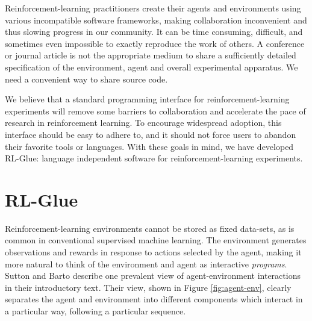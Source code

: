\documentclass[twoside,11pt]{article}
\begin{document}
Reinforcement-learning practitioners create their agents and environments using various incompatible software frameworks, making collaboration inconvenient and thus slowing progress in our community.  It can be time consuming, difficult, and sometimes even impossible to exactly reproduce the work of others.  A conference or journal article is not the appropriate medium to share a sufficiently detailed specification of the environment, agent and overall experimental apparatus.  We need a convenient way to share source code.

%
%
We believe that a standard programming interface for reinforcement-learning experiments will remove some barriers to collaboration and accelerate the pace of research in reinforcement learning.  To encourage widespread adoption, this interface should be easy to adhere to, and it should not force users to abandon their favorite tools or languages.  With these goals in mind, we have developed RL-Glue: language independent software for reinforcement-learning experiments.


\vspace{-0.2cm}
\section{RL-Glue}
\vspace{-0.2cm}
Reinforcement-learning environments cannot be stored as fixed data-sets, as is common in conventional supervised machine learning.  The environment generates observations and rewards in response to actions selected by the agent, making it more natural to think of the environment and agent as interactive \textit{programs}.  Sutton and Barto describe one prevalent view of agent-environment interactions in their introductory text\citep{rlbook}.  Their view, shown in Figure \ref{fig:agent-env}, clearly separates the agent and environment into different components which interact in a particular way, following a particular sequence.   
\end{document}
